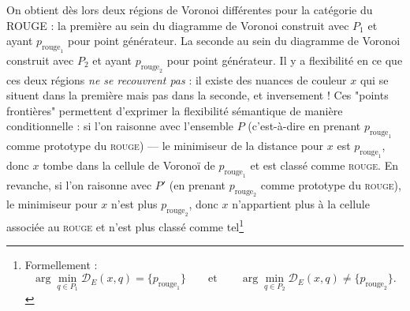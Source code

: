 \documentclass{article}
\begin{document}
On obtient dès lors deux régions de Voronoi différentes pour la catégorie du ROUGE : la première au sein du diagramme de Voronoi construit avec $P_1$ et ayant $p_{\text{rouge}_1}$ pour point générateur. La seconde au sein du diagramme de Voronoi construit avec $P_2$ et ayant $p_{\text{rouge}_2}$ pour point générateur. Il y a flexibilité en ce que ces deux régions \textit{ne se recouvrent pas} : il existe des nuances de couleur $x$ qui se situent dans la première mais pas dans la seconde, et inversement ! Ces "points frontières" permettent d'exprimer la flexibilité sémantique de manière conditionnelle : si l'on raisonne avec l'ensemble \(P\) (c'est-à-dire en prenant \(p_{\text{rouge}_1}\) comme prototype du \textsc{rouge}) — le minimiseur de la distance pour \(x\) est \(p_{\text{rouge}_1}\), donc \(x\) tombe dans la cellule de Voronoï de \(p_{\text{rouge}_1}\) et est classé comme \textsc{rouge}. En revanche, si l'on raisonne avec \(P'\) (en prenant \(p_{\text{rouge}_2}\) comme prototype du \textsc{rouge}), le minimiseur pour \(x\) n'est plus \(p_{\text{rouge}_2}\), donc \(x\) n'appartient plus à la cellule associée au \textsc{rouge} et n'est plus classé comme tel\footnote{Formellement :\[
\arg\min_{q\in P_1}\mathcal{D}_E(x,q)=\{p_{\text{rouge}_1}\}
\qquad\text{et}\qquad
\arg\min_{q\in P_2}\mathcal{D}_E(x,q)\neq\{p_{\text{rouge}_2}\}.
\]}
\end{document}
